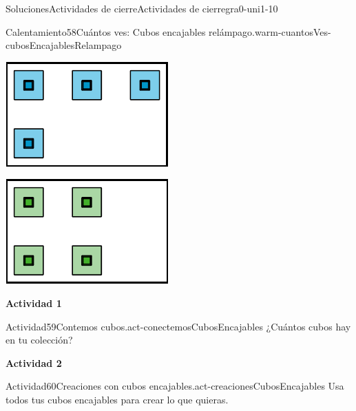 \documentclass[twoside,10pt,]{article}
\begin{document}
\begin{solutions-section}{Soluciones}{Actividades de cierre}{}{Actividades de cierre}{}{}{gra0-uni1-10}
\begin{explorationsolution}{Calentamiento}{58}{Cuántos ves: Cubos encajables relámpago.}{warm-cuantosVes-cubosEncajablesRelampago}
\begin{sidebyside}{3}{0.0166666666666667}{0.0166666666666667}{0.0333333333333333}
\begin{sbspanel}{0.3}
\includegraphics[width=\linewidth]{external/svg-source/tikz-file-153035.pdf}
\end{sbspanel}%
\begin{sbspanel}{0.3}%
\includegraphics[width=\linewidth]{external/svg-source/tikz-file-153036.pdf}
\end{sbspanel}%
\end{sidebyside}%
\end{explorationsolution}%
\par\medskip
\noindent\textbf{\large{}\space\textperiodcentered\space{}Actividad 1}
\begin{activitysolution}{Actividad}{59}{Contemos cubos.}{act-conectemosCubosEncajables}%
¿Cuántos cubos hay en tu colección?%
\end{activitysolution}%
\par\medskip
\noindent\textbf{\large{}\space\textperiodcentered\space{}Actividad 2}
\begin{activitysolution}{Actividad}{60}{Creaciones con cubos encajables.}{act-creacionesCubosEncajables}%
Usa todos tus cubos encajables para crear lo que quieras.%
\end{activitysolution}%
\end{solutions-section}
\end{document}

